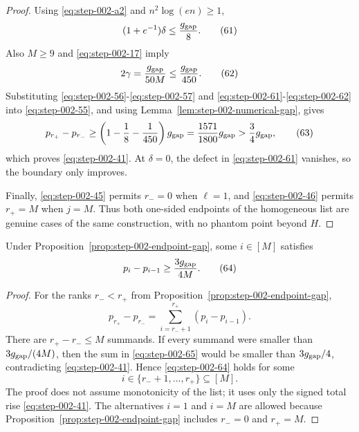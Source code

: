 \begin{proof}
Using \eqref{eq:step-002-a2} and \(n^2 \log(en)\ge 1\),
\[
(1+e^{-1})\delta\le\frac{g_{\rm gap}}8.
\tag{61}\label{eq:step-002-61}
\]
Also \(M\ge 9\) and \eqref{eq:step-002-17} imply
\[
2\gamma
=\frac{g_{\rm gap}}{50M}
\le\frac{g_{\rm gap}}{450}.
\tag{62}\label{eq:step-002-62}
\]
Substituting \eqref{eq:step-002-56}-\eqref{eq:step-002-57} and \eqref{eq:step-002-61}-\eqref{eq:step-002-62} into \eqref{eq:step-002-55}, and using Lemma~\ref{lem:step-002-numerical-gap}, gives
\[
p_{r_+}-p_{r_-}
\ge
\left(1-\frac18-\frac1{450}\right)g_{\rm gap}
=\frac{1571}{1800}g_{\rm gap}
>\frac34g_{\rm gap},
\tag{63}\label{eq:step-002-63}
\]
which proves \eqref{eq:step-002-41}. At \(\delta=0\), the defect in \eqref{eq:step-002-61} vanishes, so the boundary only improves.

Finally, \eqref{eq:step-002-45} permits \(r_-=0\) when \(\ell=1\), and \eqref{eq:step-002-46} permits \(r_+=M\) when \(j=M\). Thus both one-sided endpoints of the homogeneous list are genuine cases of the same construction, with no phantom point beyond \(H\).

\end{proof}


\begin{proposition}
\label{prop:step-002-adjacent-rise}

Under Proposition~\ref{prop:step-002-endpoint-gap}, some \(i \in [M]\) satisfies
\[
p_i-p_{i-1}\ge\frac{3g_{\rm gap}}{4M}.
\tag{64}\label{eq:step-002-64}
\]

\end{proposition}

\begin{proof}

For the ranks \(r_-<r_+\) from Proposition~\ref{prop:step-002-endpoint-gap},
\[
p_{r_+}-p_{r_-}
=\sum_{i=r_-+1}^{r_+}(p_i-p_{i-1}).
\tag{65}\label{eq:step-002-65}
\]
There are \(r_+-r_-\le M\) summands. If every summand were smaller than \(3g_{\rm gap}/(4M)\), then the sum in \eqref{eq:step-002-65} would be smaller than \(3g_{\rm gap}/4\), contradicting \eqref{eq:step-002-41}. Hence \eqref{eq:step-002-64} holds for some
\[
i\in\{r_-+1,\ldots,r_+\}\subseteq[M].
\]
The proof does not assume monotonicity of the list; it uses only the signed total rise \eqref{eq:step-002-41}. The alternatives \(i=1\) and \(i=M\) are allowed because Proposition~\ref{prop:step-002-endpoint-gap} includes \(r_-=0\) and \(r_+=M\).

\end{proof}

